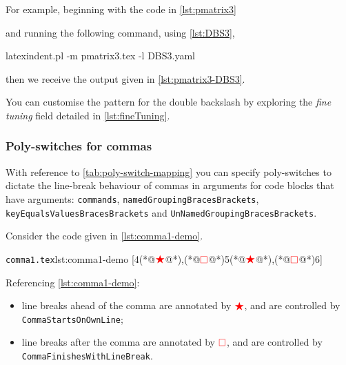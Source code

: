   \begin{example}
  For example, beginning with the code in \cref{lst:pmatrix3}


  and running the following command, using \cref{lst:DBS3},  

  \begin{commandshell}
latexindent.pl -m pmatrix3.tex -l DBS3.yaml
\end{commandshell}

  then we receive the output given in \cref{lst:pmatrix3-DBS3}.

  \end{example}

  You can customise the pattern for the double backslash by exploring the \emph{fine
  tuning} field detailed in \vref{lst:fineTuning}.

\subsubsection{Poly-switches for commas}\label{subsec:poly-switch-commas}
 With reference to \cref{tab:poly-switch-mapping} you can specify poly-switches to
 dictate the line-break behaviour of commas in arguments for code blocks that have
 arguments: \texttt{commands}, \texttt{namedGroupingBracesBrackets},
 \texttt{keyEqualsValuesBracesBrackets} and \texttt{UnNamedGroupingBracesBrackets}.

 Consider the code given in \cref{lst:comma1-demo}.
 \begin{cmhlistings}[style=tcblatex,escapeinside={(*@}{@*)}]{\texttt{comma1.tex}}{lst:comma1-demo}
[4(*@$\color{red}\bigstar$@*),(*@$\color{red}\square$@*)5(*@$\color{red}\bigstar$@*),(*@$\color{red}\square$@*)6]
\end{cmhlistings}
 Referencing \cref{lst:comma1-demo}:
 \begin{itemize}
  \item line breaks ahead of the comma are annotated by $\color{red}\bigstar$, and are
        controlled by \texttt{CommaStartsOnOwnLine};
  \item line breaks after the comma are annotated by $\color{red}\square$, and
        are controlled by \texttt{CommaFinishesWithLineBreak}.
 \end{itemize}

